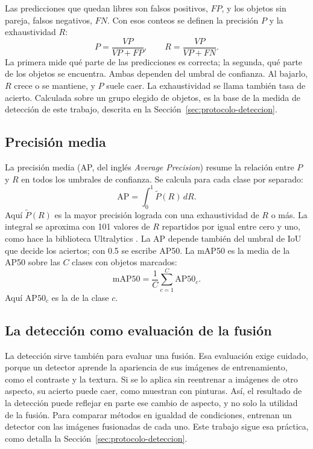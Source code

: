 Las predicciones que quedan libres son falsos positivos, $\mathit{FP}$, y los objetos sin pareja, falsos
negativos, $\mathit{FN}$. Con esos conteos se definen la precisión $P$ y la exhaustividad $R$:
\begin{equation} P=\frac{\mathit{VP}}{\mathit{VP}+\mathit{FP}},\qquad R=\frac{\mathit{VP}}{\mathit{VP}+\mathit{FN}}. \label{eq:precision-exhaustividad} \end{equation}
La primera mide qué parte de las predicciones es correcta; la segunda, qué parte de los objetos se
encuentra. Ambas dependen del umbral de confianza. Al bajarlo, $R$ crece o se mantiene, y $P$ suele
caer. La exhaustividad se llama también tasa de acierto. Calculada sobre un grupo elegido de objetos, es
la base de la medida de detección de este trabajo, descrita en la Sección~\ref{sec:protocolo-deteccion}.

\subsection{Precisión media}

La precisión media (AP, del inglés \textit{Average Precision}) resume la relación entre $P$ y $R$ en
todos los umbrales de confianza. Se calcula para cada clase por separado:
\begin{equation} \mathrm{AP}=\int_{0}^{1}\tilde{P}(R)\,dR. \label{eq:ap} \end{equation}
Aquí $\tilde{P}(R)$ es la mayor precisión lograda con una exhaustividad de $R$ o más. La integral se
aproxima con 101 valores de $R$ repartidos por igual entre cero y uno, como hace la biblioteca
Ultralytics \parencite{jocher2023}. La AP depende también del umbral
de IoU que decide los aciertos; con 0.5 se escribe AP50. La mAP50 es la media de la AP50 sobre las $C$
clases con objetos marcados:
\begin{equation} \mathrm{mAP50}=\frac{1}{C}\sum_{c=1}^{C}\mathrm{AP50}_c. \label{eq:map50} \end{equation}
Aquí $\mathrm{AP50}_c$ es la de la clase $c$.

\subsection{La detección como evaluación de la fusión}

La detección sirve también para evaluar una fusión. Esa evaluación exige cuidado, porque un detector
aprende la apariencia de sus imágenes de entrenamiento, como el contraste y la textura. Si se lo aplica
sin reentrenar a imágenes de otro aspecto, su acierto puede caer, como muestran \textcite{redmon2016}
con pinturas. Así, el resultado de la detección puede reflejar en parte ese cambio de aspecto, y no solo la utilidad
de la fusión.
Para comparar métodos en igualdad de condiciones, \textcite{liu2022} entrenan un detector con las
imágenes fusionadas de cada uno. Este trabajo sigue esa práctica, como detalla la
Sección~\ref{sec:protocolo-deteccion}.

